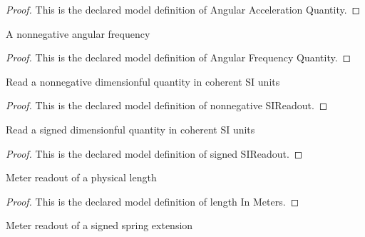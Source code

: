 \begin{proof}
  This is the declared model definition of Angular Acceleration Quantity.
\end{proof}
\begin{definition}
  \label{def:physics:phyx-mini-0269:phyxminiproblems-problemphyxmini0269-angularfrequencyquantity}
  A nonnegative angular frequency
\end{definition}
\begin{proof}
  This is the declared model definition of Angular Frequency Quantity.
\end{proof}
\begin{definition}
  \label{def:physics:phyx-mini-0269:phyxminiproblems-problemphyxmini0269-nonnegativesireadout}
  Read a nonnegative dimensionful quantity in coherent SI units
\end{definition}
\begin{proof}
  This is the declared model definition of nonnegative SIReadout.
\end{proof}
\begin{definition}
  \label{def:physics:phyx-mini-0269:phyxminiproblems-problemphyxmini0269-signedsireadout}
  Read a signed dimensionful quantity in coherent SI units
\end{definition}
\begin{proof}
  This is the declared model definition of signed SIReadout.
\end{proof}
\begin{definition}
  \label{def:physics:phyx-mini-0269:phyxminiproblems-problemphyxmini0269-lengthinmeters}
  Meter readout of a physical length
\end{definition}
\begin{proof}
  This is the declared model definition of length In Meters.
\end{proof}
\begin{definition}
  \label{def:physics:phyx-mini-0269:phyxminiproblems-problemphyxmini0269-signedlengthinmeters}
  Meter readout of a signed spring extension
\end{definition}
